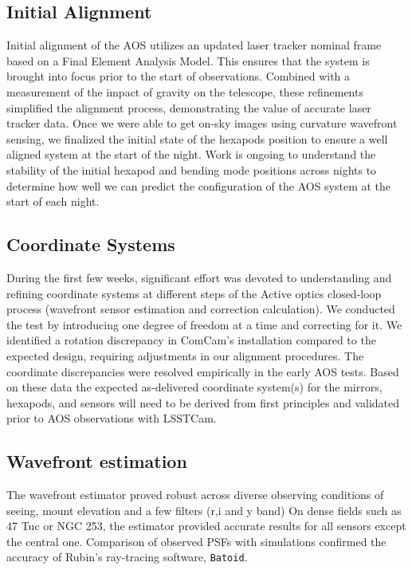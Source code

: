 \subsection{Initial Alignment}
Initial alignment of the AOS utilizes an updated laser tracker nominal frame based on a Final Element Analysis Model.  This ensures that the system is brought into focus prior to the start of observations.  Combined with a measurement of the impact of gravity on the telescope, these refinements simplified the alignment process, demonstrating the value of accurate laser tracker data. Once we were able to get on-sky images using curvature wavefront sensing, we finalized the initial state of the hexapods position to ensure a well aligned system at the start of the night. Work is ongoing to understand the stability of the initial hexapod and bending mode positions across nights to determine how well we can predict the  configuration of the AOS system at the start of each night. 


\subsection{Coordinate Systems}
During the first few weeks, significant effort was devoted to understanding and refining coordinate systems at different steps of the Active optics closed-loop process (wavefront sensor estimation and correction calculation). We conducted the test by introducing one degree of freedom at a time and correcting for it. We identified a rotation discrepancy in ComCam's installation compared to the expected design, requiring 
adjustments in our alignment procedures. The coordinate discrepancies were resolved empirically in the early AOS tests. Based on these data the expected as-delivered coordinate system(s) for the mirrors, hexapods, and sensors will need to be derived from first principles and validated prior to AOS observations with LSSTCam.


\subsection{Wavefront estimation}
The wavefront estimator proved robust across diverse observing conditions of seeing, mount elevation and a few filters (r,i and y band) 
On dense fields such as 47 Tuc or NGC 253, the estimator provided accurate results for  all sensors except the central one.  Comparison of observed PSFs with simulations  confirmed the  accuracy of Rubin's ray-tracing software, \texttt{Batoid}.

